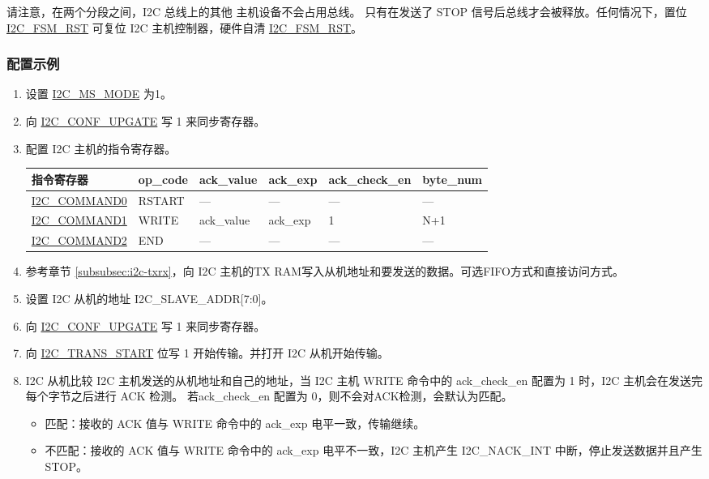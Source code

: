 \documentclass[main\_\_CN.tex]{subfiles}
\begin{document}
请注意，在两个分段之间，I2C 总线上的其他 主机设备不会占用总线。 只有在发送了 STOP 信号后总线才会被释放。任何情况下，置位 \hyperref[fielddesc:I2CFSMRST]{I2C\_FSM\_RST} 可复位 I2C 主机控制器，硬件自清 \hyperref[fielddesc:I2CFSMRST]{I2C\_FSM\_RST}。

\subsubsection{配置示例}
\begin{enumerate}
\item 设置 \hyperref[fielddesc:I2CMSMODE]{I2C\_MS\_MODE} 为1。
\item 向 \hyperref[fielddesc:I2CCONFUPGATE]{I2C\_CONF\_UPGATE} 写 1 来同步寄存器。
\item 配置 I2C 主机的指令寄存器。
\begin{longtable}{ | p{4cm} | p{2cm} | p{2cm} | p{2cm} |p{2cm} | p{2cm} |}
\hline\rowcolor{lightgray}
指令寄存器& op\_code & ack\_value&ack\_exp&ack\_check\_en&byte\_num  \\ \hline
\hyperref[fielddesc:I2CCOMMAND0]{I2C\_COMMAND0} & RSTART& ---&---&---&---  \\ \hline
\hyperref[fielddesc:I2CCOMMAND1]{I2C\_COMMAND1} & WRITE& ack\_value&ack\_exp&1&N+1  \\ \hline
\hyperref[fielddesc:I2CCOMMAND2]{I2C\_COMMAND2} & END& ---&---&---&---  \\ \hline
\end{longtable}
\item 参考章节 \ref{subsubsec:i2c-txrx}，向 I2C 主机的TX RAM写入从机地址和要发送的数据。可选FIFO方式和直接访问方式。

\item 设置 I2C 从机的地址 I2C\_SLAVE\_ADDR[7:0]。

\item 向 \hyperref[fielddesc:I2CCONFUPGATE]{I2C\_CONF\_UPGATE} 写 1 来同步寄存器。
\item 向 \hyperref[fielddesc:I2CTRANSSTART]{I2C\_TRANS\_START} 位写 1 开始传输。并打开 I2C 从机开始传输。


\item I2C 从机比较 I2C 主机发送的从机地址和自己的地址，当 I2C 主机 WRITE 命令中的 ack\_check\_en 配置为 1 时，I2C 主机会在发送完每个字节之后进行 ACK 检测。 若ack\_check\_en 配置为 0，则不会对ACK检测，会默认为匹配。
\begin{itemize}
\item 匹配：接收的 ACK 值与 WRITE 命令中的 ack\_exp 电平一致，传输继续。
\item 不匹配：接收的 ACK 值与 WRITE 命令中的 ack\_exp 电平不一致，I2C 主机产生 I2C\_NACK\_INT 中断，停止发送数据并且产生 STOP。
\end{itemize}


\end{enumerate}
\end{document}
